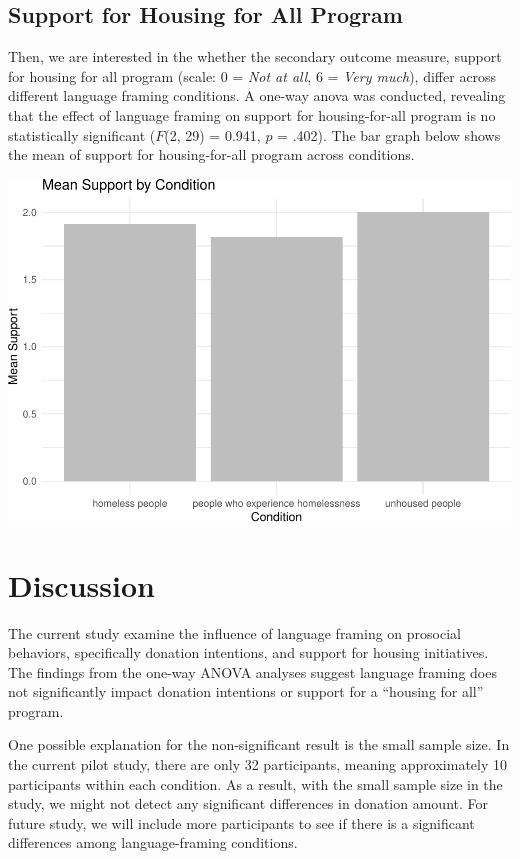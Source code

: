 \documentclass[
  man]{apa6}
\begin{document}
\hypertarget{support-for-housing-for-all-program}{%
\subsection{Support for Housing for All Program}\label{support-for-housing-for-all-program}}

Then, we are interested in the whether the secondary outcome measure, support for housing for all program (scale: 0 = \emph{Not at all}, 6 = \emph{Very much}), differ across different language framing conditions. A one-way anova was conducted, revealing that the effect of language framing on support for housing-for-all program is no statistically significant (\(F\)(2, 29) = 0.941, \(p\) = .402). The bar graph below shows the mean of support for housing-for-all program across conditions.

\includegraphics{d2m_final-project_files/figure-latex/unnamed-chunk-5-1.pdf}

\hypertarget{discussion}{%
\section{Discussion}\label{discussion}}

The current study examine the influence of language framing on prosocial behaviors, specifically donation intentions, and support for housing initiatives. The findings from the one-way ANOVA analyses suggest language framing does not significantly impact donation intentions or support for a ``housing for all'' program.

One possible explanation for the non-significant result is the small sample size. In the current pilot study, there are only 32 participants, meaning approximately 10 participants within each condition. As a result, with the small sample size in the study, we might not detect any significant differences in donation amount. For future study, we will include more participants to see if there is a significant differences among language-framing conditions.
\end{document}

